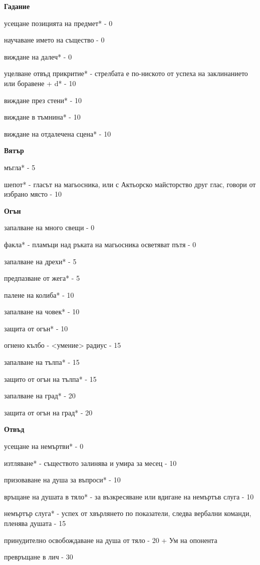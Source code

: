 \vspace{0.3cm}
\textbf{Гадание}
\begin{itemize*}
  \item{усещане позицията на предмет* - 0}
  \item{научаване името на същество - 0}
  \item{виждане на далеч* - 0}
  \item{уцелване отвъд прикритие* - стрелбата е по-ниското от успеха на заклинанието или боравене + d* - 10}
  \item{виждане през стени* - 10}
  \item{виждане в тъмнина* - 10}
  \item{виждане на отдалечена сцена* - 10}
\end{itemize*}


\vspace{0.3cm}
\textbf{Вятър}
\begin{itemize*}
  \item{мъгла* - 5}
  \item{шепот* - гласът на магьосника, или с Актьорско майсторство друг глас, говори от избрано място - 10}
\end{itemize*}


\vspace{0.3cm}
\textbf{Огън}
\begin{itemize*}
  \item{запалване на много свещи - 0}
  \item{факла* - пламъци над ръката на магьосника осветяват пътя - 0}
  \item{запалване на дрехи* - 5}
  \item{предпазване от жега* - 5}
  \item{палене на колиба* - 10}
  \item{запалване на човек* - 10}
  \item{защита от огън* - 10}
  \item{огнено кълбо - <умение> радиус - 15}
  \item{запалване на тълпа* - 15}
  \item{защито от огън на тълпа* - 15}
  \item{запалване на град* - 20}
  \item{защита от огън на град* - 20}
\end{itemize*}


\vspace{0.3cm}
\textbf{Отвъд}
\begin{itemize*}
  \item{усещане на немъртви* - 0}
  \item{изтляване* - съществото залинява и умира за месец - 10}
  \item{призоваване на душа за въпроси* - 10}
  \item{връщане на душата в тяло* - за възкресяване или вдигане на немъртъв слуга - 10}
  \item{немъртър слуга* - успех от хвърлянето по показатели, следва вербални команди, пленява душата - 15}
  \item{принудително освобождаване на душа от тяло - 20 + Ум на опонента}
  \item{превръщане в лич - 30}
\end{itemize*}


